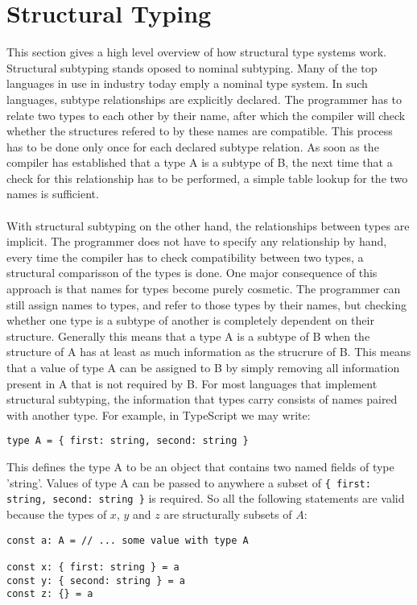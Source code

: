 \section{Structural Typing}
This section gives a high level overview of how structural type systems work.
Structural subtyping stands oposed to nominal subtyping. 
Many of the top languages in use in industry today emply a nominal type system.
In such languages, subtype relationships are explicitly declared.
The programmer has to relate two types to each other by their name,
after which the compiler will check whether the structures refered to by these names are compatible.
This process has to be done only once for each declared subtype relation.
As soon as the compiler has established that a type A is a subtype of B,
the next time that a check for this relationship has to be performed, 
a simple table lookup for the two names is sufficient.
\\
\\
With structural subtyping on the other hand, the relationships between types are implicit.
The programmer does not have to specify any relationship by hand,
every time the compiler has to check compatibility between two types, a structural comparisson of the types is done.
One major consequence of this approach is that names for types become purely cosmetic.
The programmer can still assign names to types, and refer to those types by their names,
but checking whether one type is a subtype of another is completely dependent on their structure.
Generally this means that a type A is a subtype of B when the structure of A has at least as much information as the strucrure of B.
This means that a value of type A can be assigned to B by simply removing all information present in A that is not required by B.
For most languages that implement structural subtyping, the information that types carry consists of names paired with another type.
For example, in TypeScript we may write:

\begin{lstlisting}
type A = { first: string, second: string }
\end{lstlisting}

This defines the type A to be an object that contains two named fields of type 'string'.
Values of type A can be passed to anywhere a subset of \texttt{\{ first: string, second: string \}} is required.
So all the following statements are valid because the types of $x$, $y$ and $z$ are structurally subsets of $A$:

\begin{lstlisting}
const a: A = // ... some value with type A

const x: { first: string } = a
const y: { second: string } = a
const z: {} = a
\end{lstlisting}

